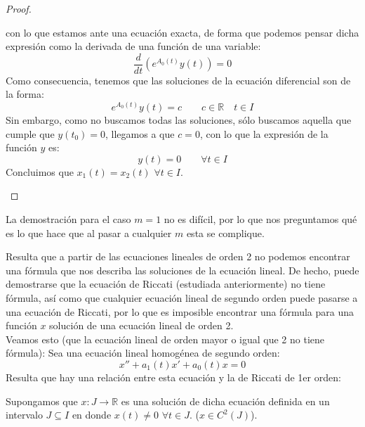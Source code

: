 \begin{prop}
\begin{proof}
\begin{description}
                con lo que estamos ante una ecuación exacta, de forma que podemos pensar dicha expresión como la derivada de una función de una variable:
                \begin{equation*}
                    \dfrac{d}{dt}\left(e^{A_0(t)}y(t)\right) = 0
                \end{equation*}
                Como consecuencia, tenemos que las soluciones de la ecuación diferencial son de la forma:
                \begin{equation*}
                    e^{A_0(t)} y(t) = c \qquad c\in \mathbb{R} \quad t\in I
                \end{equation*}
                Sin embargo, como no buscamos todas las soluciones, sólo buscamos aquella que cumple que $y(t_0) = 0$, llegamos a que $c = 0$, con lo que la expresión de la función $y$ es:
                \begin{equation*}
                    y(t) = 0 \qquad \forall t\in I
                \end{equation*}
                Concluimos que $x_1(t) = x_2(t)$ $\forall t\in I$.
        \end{description}
    \end{proof}
\end{prop}

La demostración para el caso $m=1$ no es difícil, por lo que nos preguntamos qué es lo que hace que al pasar a cualquier $m$ esta se complique.

Resulta que a partir de las ecuaciones lineales de orden 2 no podemos encontrar una fórmula que nos describa las soluciones de la ecuación lineal. De hecho, puede demostrarse que la ecuación de Riccati (estudiada anteriormente) no tiene fórmula, así como que cualquier ecuación lineal de segundo orden puede pasarse a una ecuación de Riccati, por lo que es imposible encontrar una fórmula para una función $x$ solución de una ecuación lineal de orden 2.\\


Veamos esto (que la ecuación lineal de orden mayor o igual que 2 no tiene fórmula):
Sea una ecuación lineal homogénea de segundo orden:
\begin{equation*}
    x'' + a_1(t) x' + a_0(t) x = 0
\end{equation*}
Resulta que hay una relación entre esta ecuación y la de Riccati de 1er orden:

Supongamos que $x:J\rightarrow\mathbb{R}$ es una solución de dicha ecuación definida en un intervalo $J\subseteq I$ en donde $x(t) \neq 0$ $\forall t\in J$. ($x\in C^2(J)$).

